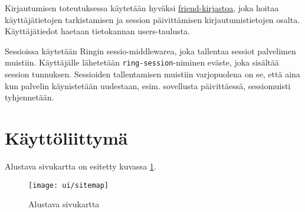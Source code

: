 \documentclass[a4paper,titlepage]{article}
\begin{document}
Kirjautumisen toteutuksessa käytetään hyväksi
\href{https://github.com/cemerick/friend}{friend-kirjastoa}, joka
hoitaa käyttäjätietojen tarkistamisen ja session päivittämisen
kirjautumistietojen osalta. Käyttäjätiedot haetaan tietokannan
users-taulusta.

Sessioissa käytetään Ringin sessio-middlewarea, joka tallentaa sessiot
palvelimen muistiin. Käyttäjälle lähetetään
\texttt{ring-session}-niminen eväste, joka sisältää session
tunnuksen. Sessioiden tallentamisen muistiin varjopuolena on se, että
aina kun palvelin käynistetään uudestaan, esim. sovellusta
päivittäessä, sessiomuisti tyhjennetään.


\section{Käyttöliittymä}

Alustava sivukartta on esitetty kuvassa \ref{fig:sivukartta}.

\begin{figure}[ht]
  \texttt{[image: ui/sitemap]}
  \caption{Alustava sivukartta}
  \label{fig:sivukartta}
\end{figure}
\end{document}
